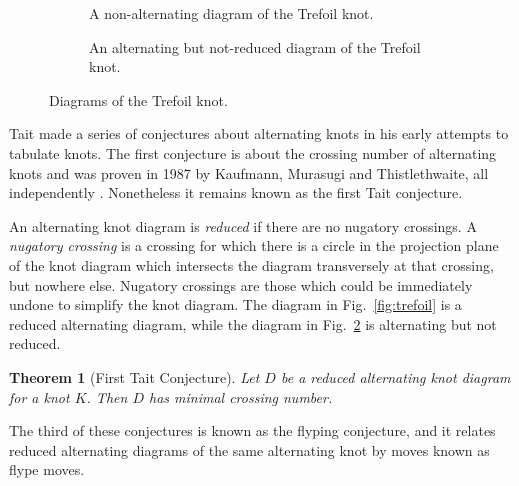 \documentclass[12pt]{report}
\newtheorem*{theorem}{Theorem}
\theoremstyle{upright}
\begin{document}
\begin{figure}[hbt!]
	\centering
	\hspace*{\fill}
	\begin{subfigure}[b]{0.4 \textwidth}
		\centering
		\def\svgscale{0.23}
		
		\caption{A non-alternating diagram of the Trefoil knot.}
		\label{fig:trefoil-nonalternating}
	\end{subfigure}
	\hspace*{\fill} \hspace*{\fill}	\hspace*{\fill}
	\begin{subfigure}[b]{0.4 \textwidth}
		\centering
		\def\svgscale{0.23}
		
		\caption{An alternating but not-reduced diagram of the Trefoil knot.}
		\label{fig:trefoil-nugatory}
	\end{subfigure}
	\hspace*{\fill} 
	\caption{Diagrams of the Trefoil knot.}
	\label{fig:trefoil-diagrams}
\end{figure}

Tait made a series of conjectures about alternating knots in his early attempts to tabulate knots. The first conjecture is about the crossing number of alternating knots and was proven in 1987 by Kaufmann, Murasugi and Thistlethwaite, all independently \cite{state-models-jones-polynomial, jones-polynomials-classical-conjectures, spanning-tree-expansion-jones-polynomial}. Nonetheless it remains known as the first Tait conjecture.

An alternating knot diagram is \textit{reduced} if there are no nugatory crossings. A \textit{nugatory crossing} is a crossing for which there is a circle in the projection plane of the knot diagram which intersects the diagram transversely at that crossing, but nowhere else. Nugatory crossings are those which could be immediately undone to simplify the knot diagram. The diagram in Fig.~\ref{fig:trefoil} is a reduced alternating diagram, while the diagram in Fig.~\ref{fig:trefoil-nugatory} is alternating but not reduced.

\begin{theorem}[First Tait Conjecture]
Let $D$ be a reduced alternating knot diagram for a knot $K$. Then $D$ has minimal crossing number.
\end{theorem}

The third of these conjectures is known as the flyping conjecture, and it relates reduced alternating diagrams of the same alternating knot by moves known as flype moves.
\end{document}
